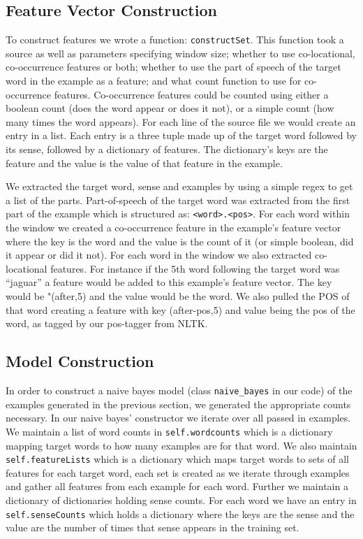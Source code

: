 \documentclass{article}
\begin{document}
\subsection{Feature Vector Construction}

To construct features we wrote a function: \texttt{constructSet}. This function took a source as well as parameters specifying window size; whether to use co-locational, co-occurrence features or both; whether to use the part of speech of the target word in the example as a feature; and what count function to use for co-occurrence features. Co-occurrence features could be counted using either a boolean count (does the word appear or does it not), or a simple count (how many times the word appears). For each line of the source file we would create an entry in a list. Each entry is a three tuple made up of the target word followed by its sense, followed by a dictionary of features. The dictionary's keys are the feature and the value is the value of that feature in the example. 

We extracted the target word, sense and examples by using a simple regex to get a list of the parts. Part-of-speech of the target word was extracted from the first part of the example which is structured as: \texttt{<word>.<pos>}. For each word within the window we created a co-occurrence feature in the example's feature vector where the key is the word and the value is the count of it (or simple boolean, did it appear or did it not). For each word in the window we also extracted co-locational features. For instance if the 5th word following the target word was ``jaguar'' a feature would be added to this example's feature vector. The key would be "(after,5) and the value would be the word. We also pulled the POS of that word creating a feature with key (after-pos,5) and value being the pos of the word, as tagged by our pos-tagger from NLTK.

\subsection{Model Construction}

In order to construct a naive bayes model (class \texttt{naive\_bayes} in our code) of the examples generated in the previous section, we generated the appropriate counts necessary. In our naive bayes' constructor we iterate over all passed in examples. We maintain a list of word counts in \texttt{self.wordcounts} which is a dictionary mapping target words to how many examples are for that word. We also maintain \texttt{self.featureLists} which is a dictionary which maps target words to sets of all features for each target word, each set is created as we iterate through examples and gather all features from each example for each word. Further we maintain a dictionary of dictionaries holding sense counts. For each word we have an entry in \texttt{self.senseCounts} which holds a dictionary where the keys are the sense and the value are the number of times that sense appears in the training set. 
\end{document}
